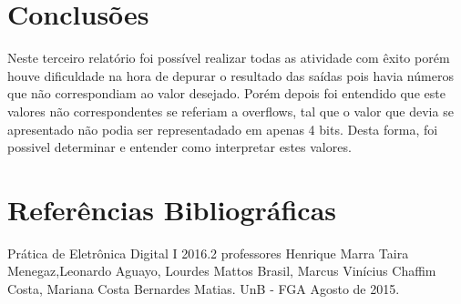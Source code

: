 \documentclass[12pts]{article}
\begin{document}
\section{Conclusões}

	Neste terceiro relatório foi possível realizar todas as atividade com êxito porém houve dificuldade na hora de depurar o resultado das saídas pois havia números que não correspondiam ao valor desejado. Porém depois foi entendido que este valores não correspondentes se referiam a overflows, tal que o valor que devia se apresentado não podia ser representadado em apenas 4 bits. Desta forma, foi possivel determinar e entender como interpretar estes valores.

\section{Referências Bibliográficas}

Prática de Eletrônica Digital I 2016.2 professores Henrique Marra Taira Menegaz,Leonardo Aguayo, Lourdes Mattos Brasil, Marcus Vinícius Chaffim Costa, Mariana Costa Bernardes Matias. UnB - FGA Agosto de 2015.

\newpage
\end{document}
